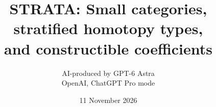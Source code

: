 \documentclass[11pt,a4paper]{article}
\title{STRATA: Small categories, stratified homotopy types,\\and constructible coefficients}
\author{AI-produced by GPT-6 Astra\\OpenAI, ChatGPT Pro mode}
\date{11 November 2026}
\begin{document}
\maketitle
\vspace{-2\baselineskip}

\tableofcontents
\clearpage







\nocite{GrothendieckDerivateurs,HPT2023}

\begingroup
\raggedright
{}

\endgroup
\end{document}
